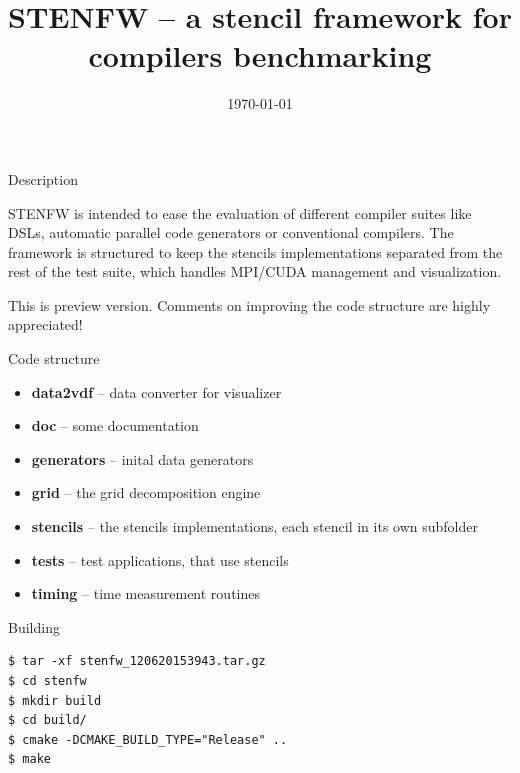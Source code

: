 \documentclass{beamer}
\title[STENFW]{STENFW -- a stencil framework for compilers benchmarking}
\institute{\href{mailto:dmitry.mikushin@usi.ch}{dmitry.mikushin@usi.ch}}
\date{\today}
\begin{document}
\begin{frame}
\titlepage
\end{frame}

\begin{frame}{Description}

STENFW is intended to ease the evaluation of different compiler suites like DSLs, automatic parallel code generators or conventional compilers. The framework is structured to keep the stencils implementations separated from the rest of the test suite, which handles MPI/CUDA management and visualization.

\vskip 15pt

This is preview version. Comments on improving the code structure are highly appreciated!

\end{frame}

\begin{frame}[fragile]{Code structure}
\begin{itemize}
\item \textbf{data2vdf} -- data converter for visualizer
\item \textbf{doc} -- some documentation
\item \textbf{generators} -- inital data generators
\item \textbf{grid} -- the grid decomposition engine
\item \textbf{stencils} -- the stencils implementations, each stencil in its own subfolder
\item \textbf{tests} -- test applications, that use stencils
\item \textbf{timing} -- time measurement routines
\end{itemize}
\end{frame}

\begin{frame}[fragile]{Building}
\begin{lstlisting}
$ tar -xf stenfw_120620153943.tar.gz 
$ cd stenfw
$ mkdir build
$ cd build/
$ cmake -DCMAKE_BUILD_TYPE="Release" ..
$ make
\end{lstlisting}
\end{frame}
\end{document}
